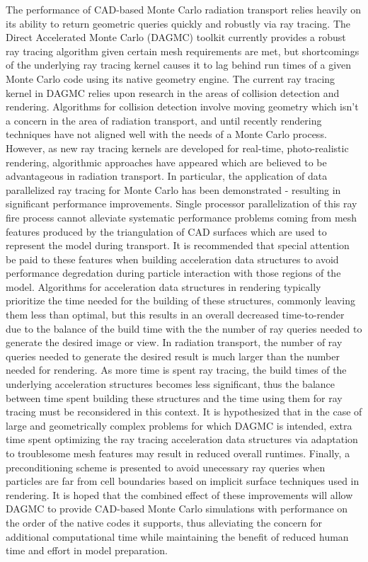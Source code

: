 \documentclass[12pt, a4paper]{article}
\begin{document}
The performance of CAD-based Monte Carlo radiation transport relies heavily on its ability to return geometric queries quickly and robustly via ray tracing. The Direct Accelerated Monte Carlo (DAGMC) toolkit currently provides a robust ray tracing algorithm\cite{Smith_2011} given certain mesh requirements are met, but shortcomings of the underlying ray tracing kernel causes it to lag behind run times of a given Monte Carlo code using its native geometry engine. The current ray tracing kernel in DAGMC relies upon research in the areas of collision detection and rendering. Algorithms for collision detection involve moving geometry which isn't a concern in the area of radiation transport, and until recently rendering techniques have not aligned well with the needs of a Monte Carlo process. However, as new ray tracing kernels are developed for real-time, photo-realistic rendering, algorithmic approaches have appeared which are believed to be advantageous in radiation transport. In particular, the application of data parallelized ray tracing for Monte Carlo has been demonstrated - resulting in significant performance improvements. Single processor parallelization of this ray fire process cannot alleviate systematic performance problems coming from mesh features produced by the triangulation of CAD surfaces which are used to represent the model during transport. It is recommended that special attention be paid to these features when building acceleration data structures to avoid performance degredation during particle interaction with those regions of the model. Algorithms for acceleration data structures in rendering typically prioritize the time needed for the building of these structures, commonly leaving them less than optimal, but this results in an overall decreased time-to-render due to the balance of the build time with the the number of ray queries needed to generate the desired image or view. In radiation transport, the number of ray queries needed to generate the desired result is much larger than the number needed for rendering. As more time is spent ray tracing, the build times of the underlying acceleration structures becomes less significant, thus the balance between time spent building these structures and the time using them for ray tracing must be reconsidered in this context. It is hypothesized that in the case of large and geometrically complex problems for which DAGMC is intended, extra time spent optimizing the ray tracing acceleration data structures via adaptation to troublesome mesh features may result in reduced overall runtimes. Finally, a preconditioning scheme is presented to avoid unecessary ray queries when particles are far from cell boundaries based on implicit surface techniques used in rendering. It is hoped that the combined effect of these improvements will allow DAGMC to provide CAD-based Monte Carlo simulations with performance on the order of the native codes it supports, thus alleviating the concern for additional computational time while maintaining the benefit of reduced human time and effort in model preparation.
\end{document}
